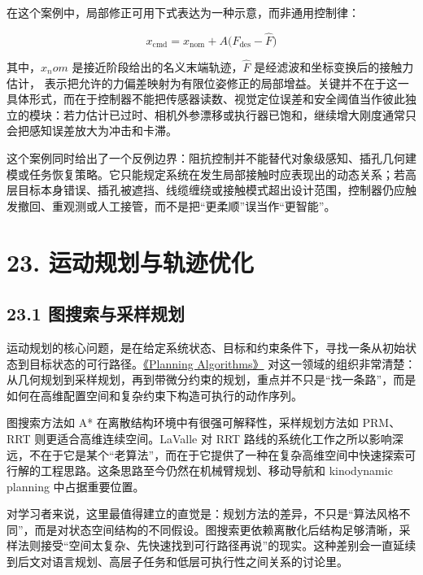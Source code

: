 在这个案例中，局部修正可用下式表达为一种示意，而非通用控制律：

\begingroup
\footnotesize
\begin{equation*}
x_{\mathrm{cmd}} = x_{\mathrm{nom}} + A\bigl(F_{\mathrm{des}} - \hat{F}\bigr)
\end{equation*}
\endgroup

其中，\(x_nom\) 是接近阶段给出的名义末端轨迹，\(\hat{F}\) 是经滤波和坐标变换后的接触力估计，\texttt{} 表示把允许的力偏差映射为有限位姿修正的局部增益。关键并不在于这一具体形式，而在于控制器不能把传感器读数、视觉定位误差和安全阈值当作彼此独立的模块：若力估计已过时、相机外参漂移或执行器已饱和，继续增大刚度通常只会把感知误差放大为冲击和卡滞。

这个案例同时给出了一个反例边界：阻抗控制并不能替代对象级感知、插孔几何建模或任务恢复策略。它只能规定系统在发生局部接触时应表现出的动态关系；若高层目标本身错误、插孔被遮挡、线缆缠绕或接触模式超出设计范围，控制器仍应触发撤回、重观测或人工接管，而不是把“更柔顺”误当作“更智能”。

\section*{23. 运动规划与轨迹优化}

\subsection*{23.1 图搜索与采样规划}


运动规划的核心问题，是在给定系统状态、目标和约束条件下，寻找一条从初始状态到目标状态的可行路径。\href{https://lavalle.pl/planning/}{《Planning Algorithms》} 对这一领域的组织非常清楚：从几何规划到采样规划，再到带微分约束的规划，重点并不只是“找一条路”，而是如何在高维配置空间和复杂约束下构造可执行的动作序列。

图搜索方法如 A* 在离散结构环境中有很强可解释性，采样规划方法如 PRM、RRT 则更适合高维连续空间。LaValle 对 RRT 路线的系统化工作之所以影响深远，不在于它是某个“老算法”，而在于它提供了一种在复杂高维空间中快速探索可行解的工程思路。这条思路至今仍然在机械臂规划、移动导航和 kinodynamic planning 中占据重要位置。

对学习者来说，这里最值得建立的直觉是：规划方法的差异，不只是“算法风格不同”，而是对状态空间结构的不同假设。图搜索更依赖离散化后结构足够清晰，采样法则接受“空间太复杂、先快速找到可行路径再说”的现实。这种差别会一直延续到后文对语言规划、高层子任务和低层可执行性之间关系的讨论里。

